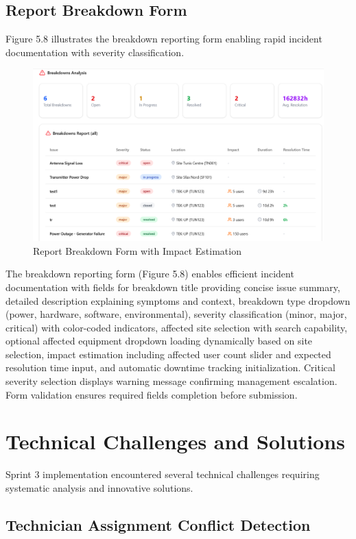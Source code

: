 \subsection{Report Breakdown Form}

Figure 5.8 illustrates the breakdown reporting form enabling rapid incident documentation with severity classification.

\begin{figure}[H]
    \centering
    \includegraphics[width=0.7\linewidth]{img/chap_05/screenshot_report_breakdown.png}
    \caption{Report Breakdown Form with Impact Estimation}
    \label{fig:report_breakdown_form}
\end{figure}

The breakdown reporting form (Figure 5.8) enables efficient incident documentation with fields for breakdown title providing concise issue summary, detailed description explaining symptoms and context, breakdown type dropdown (power, hardware, software, environmental), severity classification (minor, major, critical) with color-coded indicators, affected site selection with search capability, optional affected equipment dropdown loading dynamically based on site selection, impact estimation including affected user count slider and expected resolution time input, and automatic downtime tracking initialization. Critical severity selection displays warning message confirming management escalation. Form validation ensures required fields completion before submission.

\section{Technical Challenges and Solutions}

Sprint 3 implementation encountered several technical challenges requiring systematic analysis and innovative solutions.

\subsection{Technician Assignment Conflict Detection}


